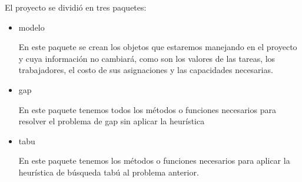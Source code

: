 \documentclass{article}
\begin{document}
El proyecto se dividió en tres paquetes: 
\begin{itemize}
	\item modelo
	
	En este paquete se crean los objetos que estaremos manejando en el proyecto y cuya información no cambiará, como son los valores de las tareas, los trabajadores, el costo de sus asignaciones y las capacidades necesarias.
	
	\item gap
	
	En este paquete tenemos todos los métodos o funciones necesarios para resolver el problema de gap sin aplicar la heurística
	
	\item tabu
	
	En este paquete tenemos los métodos o funciones necesarios para aplicar la heurística de búsqueda tabú al problema anterior.
\end{itemize}
\end{document}
